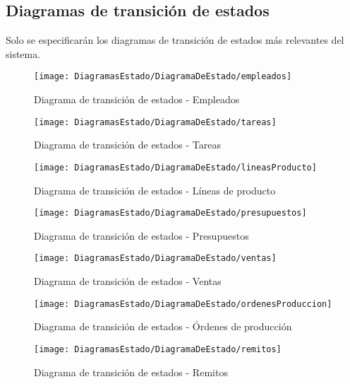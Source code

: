 	\subsection{Diagramas de transición de estados}
	Solo se especificarán los diagramas de transición de estados más relevantes del sistema.
	\begin{figure}[H]
		\centering
		\texttt{[image: DiagramasEstado/DiagramaDeEstado/empleados]}
		\caption{Diagrama de transición de estados - Empleados}
		\label{fig:Diagrama de transición de estados - Empleados}
	\end{figure}
	\begin{figure}[H]
		\centering
		\texttt{[image: DiagramasEstado/DiagramaDeEstado/tareas]}
		\caption{Diagrama de transición de estados - Tareas}
		\label{fig:Diagrama de transición de estados - Tareas}
	\end{figure}
	\begin{figure}[H]
		\centering
		\texttt{[image: DiagramasEstado/DiagramaDeEstado/lineasProducto]}
		\caption{Diagrama de transición de estados - Líneas de producto}
		\label{fig:Diagrama de transición de estados - Líneas de producto}
	\end{figure}
	\begin{figure}[H]
		\centering
		\texttt{[image: DiagramasEstado/DiagramaDeEstado/presupuestos]}
		\caption{Diagrama de transición de estados - Presupuestos}
		\label{fig:Diagrama de transición de estados - Presupuestos}
	\end{figure}
	\begin{figure}[H]
		\centering
		\texttt{[image: DiagramasEstado/DiagramaDeEstado/ventas]}
		\caption{Diagrama de transición de estados - Ventas}
		\label{fig:Diagrama de transición de estados - Ventas}
	\end{figure}
	\begin{figure}[H]
		\centering
		\texttt{[image: DiagramasEstado/DiagramaDeEstado/ordenesProduccion]}
		\caption{Diagrama de transición de estados - Órdenes de producción}
		\label{fig:Diagrama de transición de estados - Órdenes de producción}
	\end{figure}
	\begin{figure}[H]
		\centering
		\texttt{[image: DiagramasEstado/DiagramaDeEstado/remitos]}
		\caption{Diagrama de transición de estados - Remitos}
		\label{fig:Diagrama de transición de estados - Remitos}
	\end{figure}

